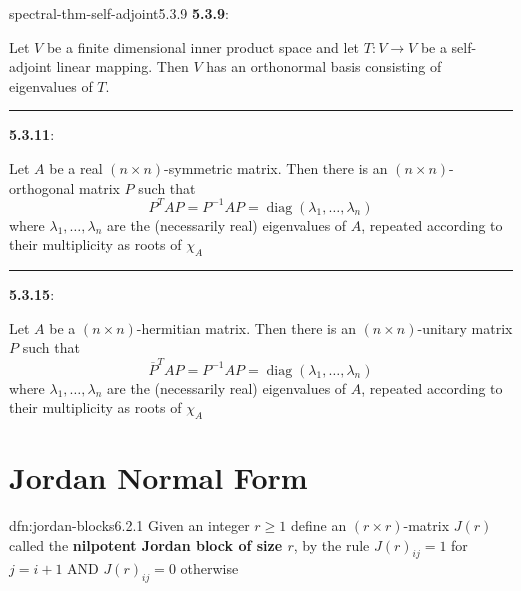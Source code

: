 \documentclass[landscape, 8pt]{extarticle}
\DeclareMathOperator{\Mat}{Mat}
\DeclareMathOperator{\diag}{diag}
\begin{document}
\begin{multicols}{3}
\begin{thm}{spectral-thm-self-adjoint}{5.3.9}
    \textbf{5.3.9}: \underline{}
    
    Let $V$ be a finite dimensional inner product space and let $T : V \to V$ be a self-adjoint linear mapping. Then $V$ has an orthonormal basis consisting of eigenvalues of $T$.

    \noindent\rule{\textwidth}{0.2pt}
    \textbf{5.3.11}: \underline{}

    Let $A$ be a real $(n \times n)$-symmetric matrix. Then there is an $(n \times n)$-orthogonal matrix $P$ such that
    \[P^{T} A P = P^{-1}AP = \diag(\lambda_{1},\dots,\lambda_{n})\]
    where $\lambda_{1},\dots,\lambda_{n}$ are the (necessarily real) eigenvalues of $A$, repeated according to their multiplicity as roots of $\chi_{A}$

    \noindent\rule{\textwidth}{0.2pt}
    \textbf{5.3.15}: \underline{}

    Let $A$ be a $(n \times n)$-hermitian matrix. Then there is an $(n \times n)$-unitary matrix $P$ such that
    \[\overline{P}^{T} A P = P^{-1}AP = \diag(\lambda_{1},\dots,\lambda_{n})\]
    where $\lambda_{1},\dots,\lambda_{n}$ are the (necessarily real) eigenvalues of $A$, repeated according to their multiplicity as roots of $\chi_{A}$
\end{thm}

\section{Jordan Normal Form}


\begin{dfn}{dfn:jordan-blocks}{6.2.1}
    Given an integer $r \ge 1$ define an $(r \times r)$-matrix $J(r)$ called the \textbf{nilpotent Jordan block of size $r$}, by the rule $J(r)_{ij} = 1$ for $j = i + 1$ AND $J(r)_{ij} = 0$ otherwise


\end{dfn}
\end{multicols}
\end{document}
